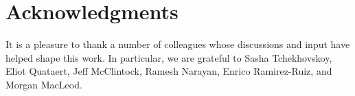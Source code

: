 \section*{Acknowledgments}

It is a pleasure to thank a number of colleagues whose discussions and input have helped shape this work.  In particular, we are grateful to Sasha Tchekhovskoy, Eliot Quataert, Jeff McClintock, Ramesh Narayan, Enrico Ramirez-Ruiz, and Morgan MacLeod.

